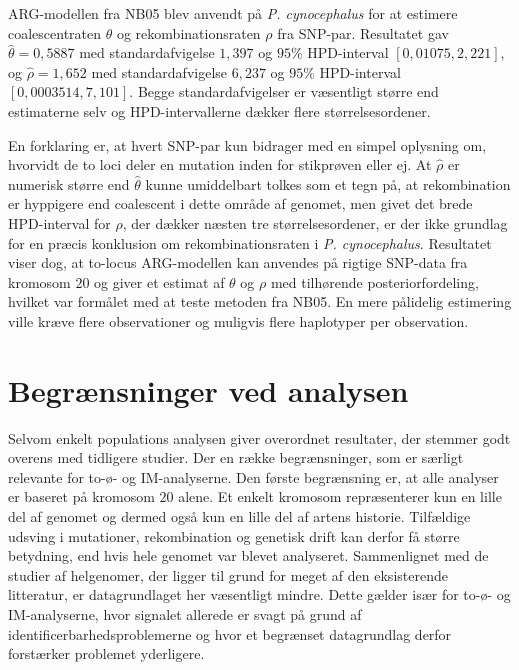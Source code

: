 \documentclass[
  10pt,
  a4paper,
]{scrbook}
\let\oldemph\emph
\renewcommand\emph[1]{\oldemph{\color{gray}#1}}
\begin{document}
ARG-modellen fra NB05 blev anvendt på \emph{P. cynocephalus} for at
estimere coalescentraten \(\theta\) og rekombinationsraten \(\rho\) fra
SNP-par. Resultatet gav \(\hat\theta = 0{,}5887\) med standardafvigelse
\(1{,}397\) og \(95\%\) HPD-interval \([0{,}01075, 2{,}221]\), og
\(\hat\rho = 1{,}652\) med standardafvigelse \(6{,}237\) og \(95\%\)
HPD-interval \([0{,}0003514, 7{,}101]\). Begge standardafvigelser er
væsentligt større end estimaterne selv og HPD-intervallerne dækker flere
størrelsesordener.

En forklaring er, at hvert SNP-par kun bidrager med en simpel oplysning
om, hvorvidt de to loci deler en mutation inden for stikprøven eller ej.
At \(\hat\rho\) er numerisk større end \(\hat\theta\) kunne umiddelbart
tolkes som et tegn på, at rekombination er hyppigere end coalescent i
dette område af genomet, men givet det brede HPD-interval for \(\rho\),
der dækker næsten tre størrelsesordener, er der ikke grundlag for en
præcis konklusion om rekombinationsraten i \emph{P. cynocephalus}.
Resultatet viser dog, at to-locus ARG-modellen kan anvendes på rigtige
SNP-data fra kromosom \(20\) og giver et estimat af \(\theta\) og
\(\rho\) med tilhørende posteriorfordeling, hvilket var formålet med at
teste metoden fra NB05. En mere pålidelig estimering ville kræve flere
observationer og muligvis flere haplotyper per observation.

\section{Begrænsninger ved
analysen}\label{begruxe6nsninger-ved-analysen}

Selvom enkelt populations analysen giver overordnet resultater, der
stemmer godt overens med tidligere studier. Der en række begrænsninger,
som er særligt relevante for to-ø- og IM-analyserne. Den første
begrænsning er, at alle analyser er baseret på kromosom \(20\) alene. Et
enkelt kromosom repræsenterer kun en lille del af genomet og dermed også
kun en lille del af artens historie. Tilfældige udsving i mutationer,
rekombination og genetisk drift kan derfor få større betydning, end hvis
hele genomet var blevet analyseret. Sammenlignet med de studier af
helgenomer, der ligger til grund for meget af den eksisterende
litteratur, er datagrundlaget her væsentligt mindre. Dette gælder især
for to-ø- og IM-analyserne, hvor signalet allerede er svagt på grund af
identificerbarhedsproblemerne og hvor et begrænset datagrundlag derfor
forstærker problemet yderligere.
\end{document}
